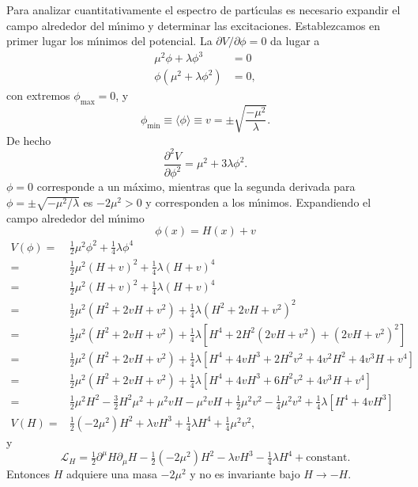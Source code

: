 Para analizar cuantitativamente el espectro de part\'\i culas es necesario expandir el campo alrededor del m\'\i nimo y determinar las excitaciones. Establezcamos en primer lugar los m\'\i nimos del potencial. La $\partial V/\partial\phi=0$ da lugar a
\begin{align}
  \mu^2\phi+\lambda\phi^3&=0\\
  \phi(\mu^2+\lambda\phi^2)&=0,
\end{align}
con extremos $\phi_{\text{max}}=0$, y 
\begin{equation}
  \label{eq:90}
  \phi_{\text{min}}\equiv\langle\phi\rangle\equiv v=\pm\sqrt{\frac{-\mu^2}{\lambda}}.
\end{equation}
De hecho 
\begin{equation}
  \frac{\partial^2V}{\partial\phi^2}=\mu^2+3\lambda\phi^2.
\end{equation}
$\phi=0$ corresponde a un m\'aximo, mientras que la segunda derivada para $\phi=\pm\sqrt{-\mu^2/\lambda}$ es $-2\mu^2\gt 0$ y corresponden a los m\'\i nimos. Expandiendo el campo alrededor del m\'\i nimo
\begin{equation}
  \phi(x)=H(x)+v
\end{equation}
\begin{align}
  V(\phi)=&\tfrac{1}{2}\mu^2 \phi^2+\tfrac{1}{4}\lambda\phi^4\nonumber\\
  =&\tfrac{1}{2}\mu^2 (H+v)^2+\tfrac{1}{4}\lambda(H+v)^4\nonumber\\
  =&\tfrac{1}{2}\mu^2 (H+v)^2+\tfrac{1}{4}\lambda(H+v)^4\nonumber\\
  =&\tfrac{1}{2}\mu^2 \left(H^2+2vH+v^2\right)+\tfrac{1}{4}\lambda\left(H^2+2vH+v^2\right)^2\nonumber\\
  =&\tfrac{1}{2}\mu^2 \left(H^2+2vH+v^2\right)+\tfrac{1}{4}\lambda\left[H^4+2H^2\left(2vH+v^2\right)+\left(2vH+v^2\right)^2\right]\nonumber\\
  =&\tfrac{1}{2}\mu^2 \left(H^2+2vH+v^2\right)+\tfrac{1}{4}\lambda\left[H^4+4vH^3+2H^2v^2+4v^2H^2+4v^3H+v^4\right]\nonumber\\
  =&\tfrac{1}{2}\mu^2 \left(H^2+2vH+v^2\right)+\tfrac{1}{4}\lambda\left[H^4+4vH^3+6H^2v^2+4v^3H+v^4\right]\nonumber\\
  =&\tfrac{1}{2}\mu^2H^2-\tfrac{3}{2}H^2\mu^2+\mu^2vH-\mu^2vH+\tfrac{1}{2}\mu^2v^2-\tfrac{1}{4}\mu^2v^2+\tfrac{1}{4}\lambda\left[H^4+4vH^3\right]\nonumber\\
\label{eq:84}
V(H)=&\tfrac{1}{2}\left(-2\mu^2\right)H^2+\lambda vH^3+\tfrac{1}{4}\lambda H^4+\tfrac{1}{4}\mu^2v^2,
\end{align}
y
\begin{equation}
  \label{eq:88}
  \mathcal{L}_H=\tfrac{1}{2}\partial^\mu H\partial_\mu H-\tfrac{1}{2}\left(-2\mu^2\right)H^2-\lambda vH^3-\tfrac{1}{4}\lambda H^4+\text{constant}.
\end{equation}
Entonces $H$ adquiere una masa $-2\mu^2$ y no es invariante bajo $H\to-H$. 

